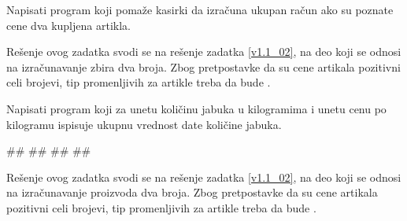 \begin{Exercise}[label=p1_005]
Napisati program koji pomaže kasirki da izračuna ukupan račun ako su poznate cene dva kupljena artikla. 


\end{Exercise}
\begin{Answer}[ref=p1_005]

Rešenje ovog zadatka svodi se na rešenje zadatka \ref{v1.1_02}, na deo koji se odnosi na izračunavanje zbira dva broja. Zbog pretpostavke da su cene artikala pozitivni celi brojevi, tip promenljivih za artikle treba da bude .
\end{Answer}

\begin{Exercise}[label=p1_05]
Napisati program koji za unetu količinu jabuka u kilogramima i unetu
cenu po kilogramu ispisuje ukupnu vrednost date količine jabuka.  

\begin{miditest}
\begin{upotreba}{1}
#\naslovInt#
##
##
##
\end{upotreba}
\end{miditest}
\end{Exercise}
\begin{Answer}[ref=p1_05]

Rešenje ovog zadatka svodi se na rešenje zadatka \ref{v1.1_02}, na deo koji se odnosi na izračunavanje proizvoda dva broja. Zbog pretpostavke da su cene artikala pozitivni celi brojevi, tip promenljivih za artikle treba da bude .
\end{Answer}

